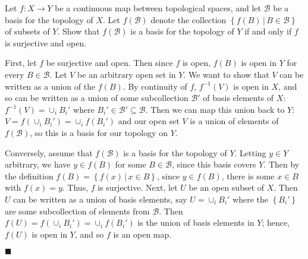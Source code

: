 \documentclass[12pt]{article}
\renewcommand{\qed}{\hfill$\blacksquare$}
\renewenvironment{proof}{\begin{addmargin}[1em]{0em}\begin{newproof}}{\end{newproof}\end{addmargin}\qed}
\newenvironment{problem}[2][Problem]{\begin{trivlist}
\item[\hskip \labelsep {\bfseries #1}\hskip \labelsep {\bfseries #2.}]}{\end{trivlist}}
\begin{document}
\begin{problem}{2-11}
	Let $f:X\rightarrow Y$ be a continuous map between topological spaces, and let $\mathcal{B}$ be a basis for the topology of $X$. Let $f\left(\mathcal{B}\right)$ denote the collection $\left\{ f\left(B\right) \, | \, B\in \mathcal{B}\right\}$ of subsets of $Y$. Show that $f\left(\mathcal{B}\right)$ is a basis for the topology of $Y$ if and only if $f$ is surjective and open.
\end{problem}
\begin{proof}
First, let $f$ be surjective and open. Then since $f$ is open, $f\left(B\right)$ is open in $Y$ for every $B\in \mathcal{B}$. Let $V$ be an arbitrary open set in $Y$. We want to show that $V$ can be written as a union of the $f\left(B\right)$. By continuity of $f$, $f^{-1}\left(V\right)$ is open in $X$, and so can be written as a union of some subcollection $\mathcal{B}'$ of basis elements of $X$: $f^{-1}\left(V\right) = \cup_i B_i' $ where $B_i'\in \mathcal{B}' \subseteq \mathcal{B}$. Then we can map this union back to $Y$: $V = f\left(\cup_i B_i'\right)= \cup_i f\left(B_i'\right)$ and our open set $V$ is a union of elements of $f\left(\mathcal{B}\right)$, so this is a basis for our topology on $Y$.

Conversely, assume that $f\left(\mathcal{B}\right)$ is a basis for the topology of $Y$. Letting $y\in Y$ arbitrary, we have $y \in f\left(B\right)$ for some $B \in \mathcal{B}$, since this basis covers $Y$. Then by the definition $f\left(B\right) = \left\{ f\left(x\right)\, | \, x\in B\right\}$, since $y\in f\left(B\right)$, there is some $x \in B$ with $f\left(x\right)=y$. Thus, $f$ is surjective. Next, let $U$ be an open subset of $X$. Then $U$ can be written as a union of basis elements, say $U = \cup_i B_i'$ where the $\left\{B_i'\right\}$ are some subcollection of elements from $\mathcal{B}$. Then $f\left(U\right) = f\left(\cup_i B_i'\right) = \cup_i f\left(B_i'\right)$ is the union of basis elements in $Y$; hence, $f\left(U\right)$ is open in $Y$, and so $f$ is an open map.
\end{proof}
\end{document}
